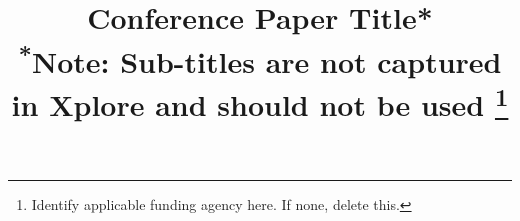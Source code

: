\documentclass[conference]{IEEEtran}
\begin{document}
\title{Conference Paper Title*\\
{\footnotesize \textsuperscript{*}Note: Sub-titles are not captured in Xplore and
should not be used}
\thanks{Identify applicable funding agency here. If none, delete this.}
}


\maketitle
\end{document}
